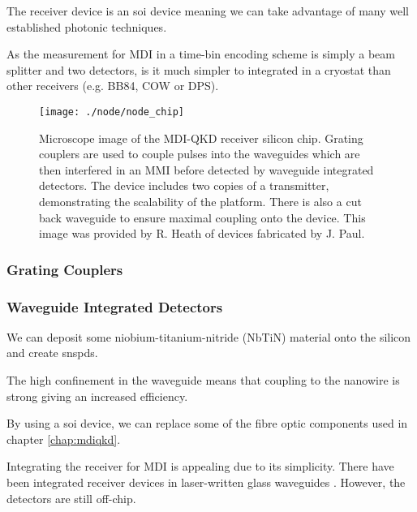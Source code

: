 The receiver device is an \ac{soi} device meaning we can take advantage of many well established photonic techniques.

As the measurement for \ac{MDI} in a time-bin encoding scheme is simply a beam splitter and two detectors, is it much simpler to integrated in a cryostat than other receivers (e.g. BB84, COW or DPS).

\begin{figure}[tbp]
	\centering
	\texttt{[image: ./node/node\_chip]}
	\caption[Silicon MDI-QKD receiver with waveguide integrated detectors]{Microscope image of the MDI-QKD receiver silicon chip. Grating couplers are used to couple pulses into the waveguides which are then interfered in an MMI before detected by waveguide integrated detectors. The device includes two copies of a transmitter, demonstrating the scalability of the platform. There is also a cut back waveguide to ensure maximal coupling onto the device. This image was provided by R. Heath of devices fabricated by J. Paul.}
	\label{fig:node_chip}
\end{figure}

\subsubsection*{Grating Couplers}

\subsubsection*{Waveguide Integrated Detectors}

We can deposit some niobium-titanium-nitride (NbTiN) material onto the silicon and create \acp{snspd}. 

The high confinement in the waveguide means that coupling to the nanowire is strong giving an increased efficiency. 

By using a \ac{soi} device, we can replace some of the fibre optic components used in chapter \ref{chap:mdiqkd}.

Integrating the receiver for \ac{MDI} is appealing due to its simplicity. There have been integrated receiver devices in laser-written glass waveguides \cite{wang2019}. However, the detectors are still off-chip.

%

